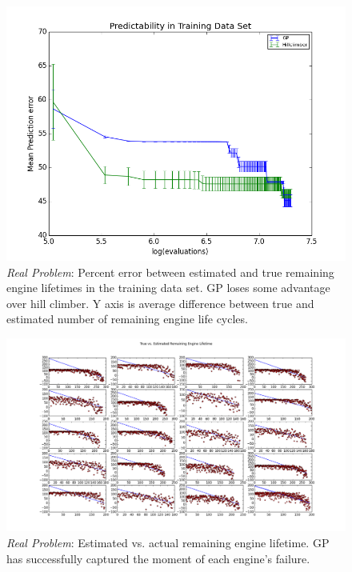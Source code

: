 \documentclass{acm_proc_article-sp}
\begin{document}
\begin{figure}
\centering
\includegraphics[scale=0.65]{bigplot_2k.png}
\caption{{\it{Real Problem}}: Percent error between estimated and true remaining engine lifetimes in the training data set. GP loses some advantage over hill climber. Y axis is average difference between true and estimated number of remaining engine life cycles.}
\end{figure}

\begin{figure}
\centering
\includegraphics[scale=0.35]{first_20.png}
\caption{{\it{Real Problem}}: Estimated vs. actual remaining engine lifetime. GP has successfully captured the moment of each engine's failure.}
\end{figure}
\end{document}
